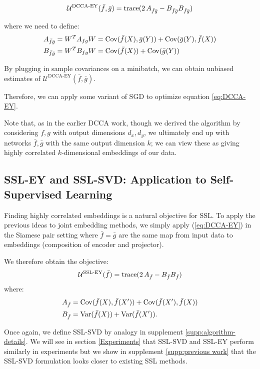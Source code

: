 \begin{align}\label{eq:DCCA-EY}
    \mathcal{U}^\text{DCCA-EY}(\bar{f},\bar{g}) = \operatorname{trace}(2 \, A_{\bar{f}\bar{g}} - B_{\bar{f}\bar{g}} B_{\bar{f}\bar{g}})
\end{align}

where we need to define:
\begin{align*}
    A_{\bar{f}\bar{g}}
    &= W^T A_{fg} W 
    = \mathrm{Cov}(\bar{f}(X),\bar{g}(Y)) + \mathrm{Cov}(\bar{g}(Y),\bar{f}(X)) \\
    B_{\bar{f}\bar{g}} 
    &= W^T B_{fg} W 
    = \mathrm{Cov}(\bar{f}(X)) + \mathrm{Cov}(\bar{g}(Y))
\end{align*}


By plugging in sample covariances on a minibatch, we can obtain unbiased estimates of $\mathcal{U}^\text{DCCA-EY}(\bar{f},\bar{g})$.

Therefore, we can apply some variant of SGD to optimize equation \ref{eq:DCCA-EY}.

Note that, as in the earlier DCCA work, though we derived the algorithm by considering $f,g$ with output dimensions $d_x,d_y$, we ultimately end up with networks $\bar{f},\bar{g}$ with the same output dimension $k$; we can view these as giving highly correlated $k$-dimensional embeddings of our data.

\subsection{SSL-EY and SSL-SVD: Application to Self-Supervised Learning}

Finding highly correlated embeddings is a natural objective for SSL.
To apply the previous ideas to joint embedding methods, we simply apply (\ref{eq:DCCA-EY}) in the Siamese pair setting where $\bar{f}=\bar{g}$ are the same map from input data to embeddings (composition of encoder and projector).

We therefore obtain the objective:
\begin{align}\label{eq:SSL-EY}
    \mathcal{U}^\text{SSL-EY}(\bar{f}) =\operatorname{trace}( 2 \, A_{\bar{f}} - B_{\bar{f}} B_{\bar{f}})
\end{align}
where:
\begin{align*}
    A_{\bar{f}}
    &= \mathrm{Cov}(\bar{f}(X),\bar{f}(X')) + \mathrm{Cov}(\bar{f}(X'),\bar{f}(X)) \\
    B_{\bar{f}} 
    &= \mathrm{Var}(\bar{f}(X)) + \mathrm{Var}(\bar{f}(X')).
\end{align*}

Once again, we define SSL-SVD by analogy in supplement \ref{supp:algorithm-details}. We will see in section \ref{Experiments} that SSL-SVD and SSL-EY perform similarly in experiments but we show in supplement \ref{supp:previous work} that the SSL-SVD formulation looks closer to existing SSL methods.

